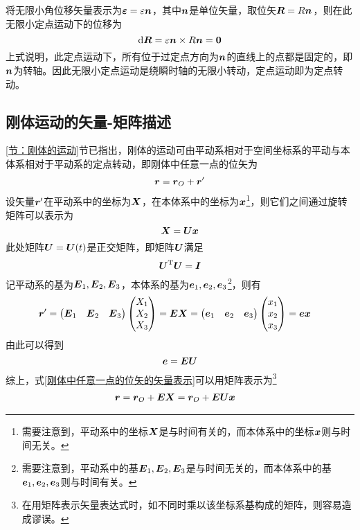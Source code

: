 将无限小角位移矢量表示为$\boldsymbol{\varepsilon} = \varepsilon \boldsymbol{n}$，其中$\boldsymbol{n}$是单位矢量，取位矢$\boldsymbol{R} = R\boldsymbol{n}$，则在此无限小定点运动下的位移为
\begin{equation*}
	\mathrm{d} \boldsymbol{R} = \varepsilon \boldsymbol{n} \times R\boldsymbol{n} = \boldsymbol{0}
\end{equation*}
上式说明，此定点运动下，所有位于过定点方向为$\boldsymbol{n}$的直线上的点都是固定的，即$\boldsymbol{n}$为转轴。因此无限小定点运动是绕瞬时轴的无限小转动，定点运动即为{\heiti 定点转动}。

\subsection{刚体运动的矢量-矩阵描述}

\label{节：刚体运动的矢量-矩阵描述}
\ref{节：刚体的运动}节已指出，刚体的运动可由平动系相对于空间坐标系的平动与本体系相对于平动系的定点转动，即刚体中任意一点的位矢为
\begin{equation}
	\boldsymbol{r} = \boldsymbol{r}_O + \boldsymbol{r}'
	\label{刚体中任意一点的位矢的矢量表示}
\end{equation}
设矢量$\boldsymbol{r}'$在平动系中的坐标为$\boldsymbol{X}$，在本体系中的坐标为$\boldsymbol{x}$\footnote{需要注意到，平动系中的坐标$\boldsymbol{X}$是与时间有关的，而本体系中的坐标$\boldsymbol{x}$则与时间无关。}，则它们之间通过旋转矩阵可以表示为
\begin{equation*}
	\boldsymbol{X} = \boldsymbol{U} \boldsymbol{x}
\end{equation*}
此处矩阵$\boldsymbol{U} = \boldsymbol{U}(t)$是正交矩阵，即矩阵$\boldsymbol{U}$满足
\begin{equation}
	\boldsymbol{U}^{\mathrm{T}} \boldsymbol{U} = \boldsymbol{I}
	\label{正交矩阵的条件}
\end{equation}
记平动系的基为$\boldsymbol{E}_1,\boldsymbol{E}_2,\boldsymbol{E}_3$，本体系的基为$\boldsymbol{e}_1,\boldsymbol{e}_2,\boldsymbol{e}_3$\footnote{需要注意到，平动系中的基$\boldsymbol{E}_1,\boldsymbol{E}_2,\boldsymbol{E}_3$是与时间无关的，而本体系中的基$\boldsymbol{e}_1,\boldsymbol{e}_2,\boldsymbol{e}_3$则与时间有关。}，则有
\begin{align*}
	\boldsymbol{r}' & = \begin{pmatrix} \boldsymbol{E}_1 & \boldsymbol{E}_2 & \boldsymbol{E}_3 \end{pmatrix} \begin{pmatrix} X_1 \\ X_2 \\ X_3 \end{pmatrix} = \boldsymbol{E} \boldsymbol{X} = \begin{pmatrix} \boldsymbol{e}_1 & \boldsymbol{e}_2 & \boldsymbol{e}_3 \end{pmatrix} \begin{pmatrix} x_1 \\ x_2 \\ x_3 \end{pmatrix} = \boldsymbol{e} \boldsymbol{x}
\end{align*}
由此可以得到
\begin{equation*}
	\boldsymbol{e} = \boldsymbol{E} \boldsymbol{U}
\end{equation*}
综上，式\eqref{刚体中任意一点的位矢的矢量表示}可以用矩阵表示为\footnote{在用矩阵表示矢量表达式时，如不同时乘以该坐标系基构成的矩阵，则容易造成谬误。}
\begin{align}
	\boldsymbol{r} & = \boldsymbol{r}_O + \boldsymbol{E} \boldsymbol{X} = \boldsymbol{r}_O + \boldsymbol{E} \boldsymbol{U} \boldsymbol{x}
	\label{刚体中任意一点的位矢}
\end{align}

